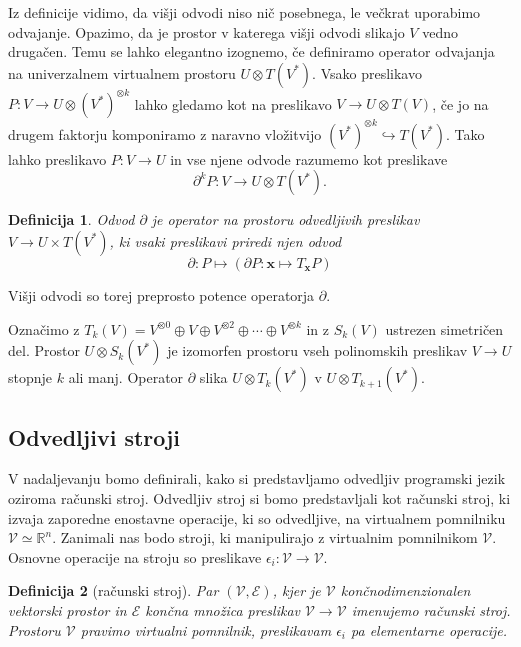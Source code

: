 \documentclass{article}
\newcommand{\RR}{\mathbb{R}}
\newcommand{\E}{\mathcal{E}}
\newcommand{\VV}{\mathcal{V}}
\newcommand{\x}{\mathbf{x}}
\newcommand{\D}{\partial}
\newtheorem{definicija}{Definicija}[section]
\begin{document}
Iz definicije vidimo, da višji odvodi niso nič posebnega, le večkrat uporabimo
odvajanje. Opazimo, da je prostor v katerega višji odvodi slikajo $V$
vedno drugačen. Temu se lahko elegantno izognemo, če definiramo operator
odvajanja na univerzalnem virtualnem prostoru $U\otimes T(V^*)$. Vsako preslikavo $P:V\to U\otimes (V^*)^{\otimes k}$ lahko gledamo kot na
preslikavo $V\to U\otimes T(V)$, če jo na drugem faktorju komponiramo z naravno
vložitvijo $(V^*)^{\otimes k}\hookrightarrow T(V^*)$. Tako lahko preslikavo
$P:V\to U$ in vse njene odvode razumemo kot preslikave 
$$\D^k P:V\to U\otimes T(V^*).$$ 
\begin{definicija}\label{def:partial}
  Odvod
  $\D$ je operator na prostoru odvedljivih preslikav $V\to U\times T(V^*)$, ki
  vsaki preslikavi priredi njen odvod
  \begin{equation}
    \label{eq:odvod_splosen}
    \D : P \mapsto (\D P:\x\mapsto T_\x P)
  \end{equation}
\end{definicija}
Višji odvodi so torej preprosto potence operatorja $\D$.

Označimo z $T_k(V)=V^{\otimes 0}\oplus V \oplus V^{\otimes 2} \oplus \cdots
\oplus V^{\otimes k}$ in z $S_k(V)$ ustrezen simetričen del. Prostor $U\otimes
S_k(V^*)$ je izomorfen  prostoru vseh polinomskih preslikav $V\to U$ stopnje $k$
ali manj. Operator $\D$ slika $U\otimes T_k(V^*)$ v $U\otimes T_{k+1}(V^*)$.


\subsection{Odvedljivi stroji}

V nadaljevanju bomo definirali, kako si predstavljamo odvedljiv programski jezik
oziroma računski stroj. Odvedljiv stroj si bomo predstavljali kot računski
stroj, ki izvaja zaporedne enostavne operacije, ki so odvedljive, na virtualnem
pomnilniku $\VV\simeq\RR^n$. 
Zanimali nas bodo stroji, ki manipulirajo z virtualnim
pomnilnikom $\VV$. Osnovne operacije na stroju so preslikave 
$\epsilon_i:\VV\to \VV$.
\begin{definicija}[računski stroj]
  Par $(\VV,\E)$, kjer je $\VV$ končnodimenzionalen vektorski prostor in $\E$
  končna množica preslikav $\VV\to \VV$ imenujemo \emph{računski stroj}.
  Prostoru $\VV$ pravimo \emph{virtualni pomnilnik}, preslikavam $\epsilon_i$ pa
  \emph{elementarne operacije}.
\end{definicija}
\end{document}
